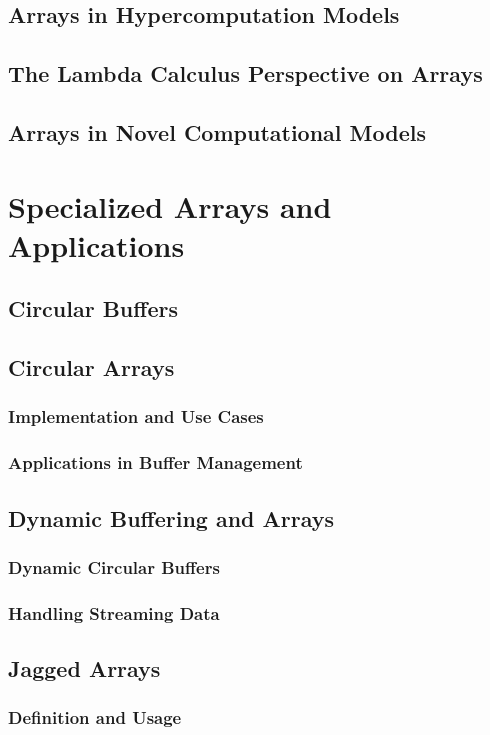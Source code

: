 \documentclass[12pt, oneside]{book}
\begin{document}
	\section{Arrays in Hypercomputation Models}
	\section{The Lambda Calculus Perspective on Arrays}
	\section{Arrays in Novel Computational Models}
	
	\chapter{Specialized Arrays and Applications}
	\section{Circular Buffers}
	\section{Circular Arrays}
	\subsection{Implementation and Use Cases}
	\subsection{Applications in Buffer Management}
	
	\section{Dynamic Buffering and Arrays}
	\subsection{Dynamic Circular Buffers}
	\subsection{Handling Streaming Data}
	
	\section{Jagged Arrays}
	\subsection{Definition and Usage}
\end{document}
